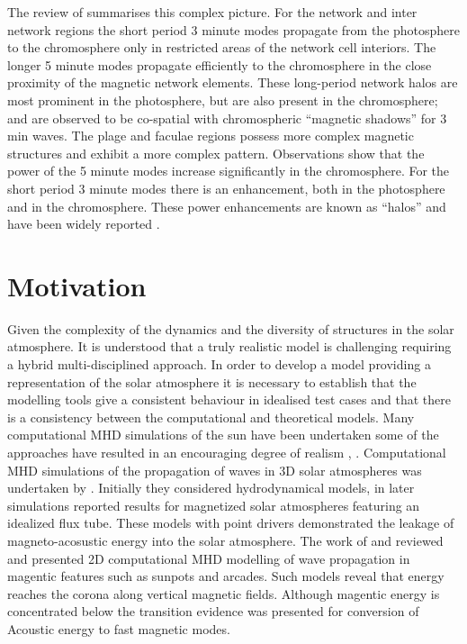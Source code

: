 \documentclass{aastex62}
\begin{document}
The review of \citet{Khomenko2013} summarises this complex picture. For the network and inter network regions the short period 3 minute modes propagate from the photosphere to the chromosphere only in restricted areas of the network cell interiors. The longer 5 minute modes propagate efficiently to the chromosphere in the close proximity of the magnetic network elements. These long-period network halos are most prominent in the photosphere, but are also present in the chromosphere; and are observed to be co-spatial with chromospheric “magnetic shadows” for 3 min waves. The plage and faculae regions possess more complex magnetic structures and exhibit a more complex pattern.  Observations show that the power of the 5 minute modes increase significantly in the chromosphere. For the short period  3 minute modes there is an enhancement, both in the photosphere and in the chromosphere. These power enhancements are known as “halos” and have been widely reported \cite{Kontogiannis2010}. 

\section{Motivation} \label{sec:motivation}

Given the complexity of the dynamics and the diversity of structures in the solar atmosphere. It is understood that a truly realistic model is challenging requiring a hybrid multi-disciplined approach. In order to develop a model providing a representation of the solar atmosphere it is necessary to establish that the modelling tools give a consistent behaviour in idealised test cases and that there is a consistency between the computational and theoretical models. Many computational MHD simulations of the sun have been undertaken some of the approaches have resulted in an encouraging degree of realism  \citet{Vogler2005}, \citet{Gudiksen2011}. Computational MHD simulations of the propagation of waves in 3D solar atmospheres was undertaken by \citet{Fedun2009}. Initially they considered hydrodynamical models, in later simulations \citet{Fedun2011} \citet{Vigeesh2012} reported results for magnetized solar atmospheres featuring an idealized flux tube. These models with point drivers demonstrated the leakage of magneto-acosustic energy into the solar atmosphere. The work of \citet{Khomenko2013} and  \citet{Santamaria2015} reviewed and presented 2D computational MHD modelling of wave propagation in magentic features such as sunpots and arcades. Such models reveal that energy reaches the corona along vertical magnetic fields. Although magentic energy is concentrated below the transition evidence was presented for conversion of Acoustic energy to fast magnetic modes.
\end{document}
